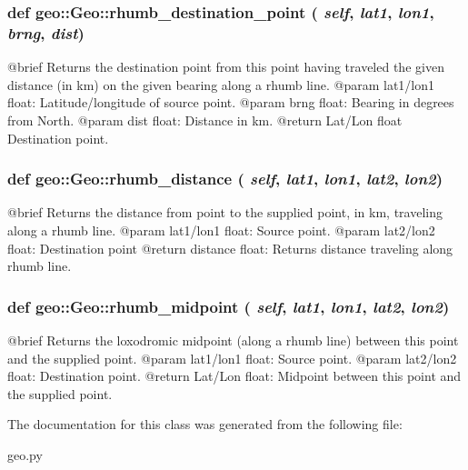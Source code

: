 \hypertarget{classgeo_1_1Geo_a8a38f7e50bce307533860ad569530478}{
\subsubsection[{rhumb\_\-destination\_\-point}]{\setlength{\rightskip}{0pt plus 5cm}def geo::Geo::rhumb\_\-destination\_\-point ( {\em self}, \/   {\em lat1}, \/   {\em lon1}, \/   {\em brng}, \/   {\em dist})}}
\label{classgeo_1_1Geo_a8a38f7e50bce307533860ad569530478}
\begin{DoxyVerb}@brief Returns the destination point from this point having traveled the given
    distance (in km) on the given bearing along a rhumb line.
    @param lat1/lon1 float: Latitude/longitude of source point.
    @param brng float: Bearing in degrees from North.
    @param dist float: Distance in km.
    @return {Lat/Lon} float Destination point.\end{DoxyVerb}
 \hypertarget{classgeo_1_1Geo_aa7a656b695ac9938e4064a32df34ca4b}{
\subsubsection[{rhumb\_\-distance}]{\setlength{\rightskip}{0pt plus 5cm}def geo::Geo::rhumb\_\-distance ( {\em self}, \/   {\em lat1}, \/   {\em lon1}, \/   {\em lat2}, \/   {\em lon2})}}
\label{classgeo_1_1Geo_aa7a656b695ac9938e4064a32df34ca4b}
\begin{DoxyVerb}@brief Returns the distance from point to the supplied point, 
    in km, traveling along a rhumb line.
    @param {lat1/lon1} float: Source point.
    @param {lat2/lon2} float: Destination point
    @return distance float: Returns distance traveling along rhumb line.\end{DoxyVerb}
 \hypertarget{classgeo_1_1Geo_acaad81d93d99d1193ed36fb229ccfe35}{
\subsubsection[{rhumb\_\-midpoint}]{\setlength{\rightskip}{0pt plus 5cm}def geo::Geo::rhumb\_\-midpoint ( {\em self}, \/   {\em lat1}, \/   {\em lon1}, \/   {\em lat2}, \/   {\em lon2})}}
\label{classgeo_1_1Geo_acaad81d93d99d1193ed36fb229ccfe35}
\begin{DoxyVerb}@brief Returns the loxodromic midpoint (along a rhumb line) between 
    this point and the supplied point.
    @param {lat1/lon1} float: Source point.
    @param {lat2/lon2} float: Destination point.
    @return {Lat/Lon} float: Midpoint between this point and the supplied point.\end{DoxyVerb}
 

The documentation for this class was generated from the following file:\begin{DoxyCompactItemize}
\item 
geo.py\end{DoxyCompactItemize}
